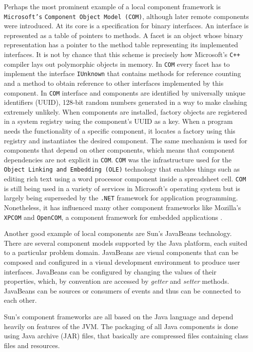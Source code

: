 Perhaps the most prominent example of a local component framework is \texttt{Microsoft's} \texttt{Component Object Model (COM)}, although
later remote components were introduced. At its core is a specification for binary interfaces. An interface is represented as a table of
pointers to methods. A facet is an object whose binary representation has a pointer to the method table representing its implemented interfaces.
It is not by chance that this scheme is precisely how Microsoft's \texttt{C++} compiler lays out polymorphic objects in memory.
In \texttt{COM} every facet has to implement the interface \texttt{IUnknown} that contains methods for reference counting and a method
to obtain reference to other interfaces implemented by this component. In \texttt{COM} interface and components are identified by
universally unique identifiers (UUID), 128-bit random numbers generated in a way to make clashing extremely unlikely.
When components are installed, factory objects are registered in a system registry using the component's UUID as a key.
When a program needs the functionality of a specific component, it locates a factory using this registry and instantiates the desired component.
The same mechanism is used for components that depend on other components, which means that component dependencies are not explicit
in \texttt{COM}. \texttt{COM} was the infrastructure used for the \texttt{Object Linking and Embedding (OLE)} technology that enables
things such as editing rich text using a word processor component inside a spreadsheet cell. \texttt{COM} is still being used
in a variety of services in Microsoft's operating system but is largely being superseded by the \texttt{.NET} framework for application
programming. Nonetheless, it has influenced many other component frameworks like Mozilla's \texttt{XPCOM} and \texttt{OpenCOM}, a component
framework for embedded applications \cite{XPCOM} \cite{OpenCOM01}.

Another good example of local components are Sun's JavaBeans technology. There are several component models supported by the Java platform, each
suited to a particular problem domain. JavaBeans are visual components that can be composed and configured in a visual development environment
to produce user interfaces. JavaBeans can be configured by changing the values of their properties, which, by convention are accessed by \emph{getter}
and \emph{setter} methods. JavaBeans can be sources or consumers of events and thus can be connected to each other. 

Sun's component frameworks are all based on the Java language and depend heavily on features of the JVM. The packaging of all Java components is
done using Java archive (JAR) files, that basically are compressed files containing class files and resources.

